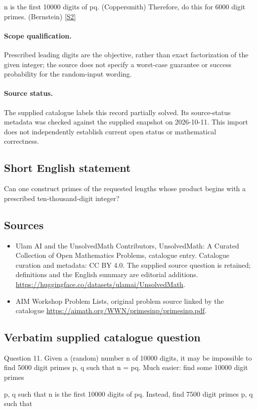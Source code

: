 \documentclass[11pt]{article}
\begin{document}
n is the first 10000 digits of pq. (Coppersmith) Therefore, do this for 6000 digit primes. (Bernstein) \href{https://aimath.org/WWN/primesinp/primesinp.pdf}{[S2]}
\paragraph{Scope qualification.}
Prescribed leading digits are the objective, rather than exact factorization of the given integer; the source does not specify a worst-case guarantee or success probability for the random-input wording.
\paragraph{Source status.}
The supplied catalogue labels this record partially solved. Its source-status metadata was checked against the supplied snapshot on 2026-10-11. This import does not independently establish current open status or mathematical correctness.
\subsection{Short English statement}
Can one construct primes of the requested lengths whose product begins with a prescribed ten-thousand-digit integer?
\subsection{Sources}
\begin{itemize}
\item[S1] Ulam AI and the UnsolvedMath Contributors, UnsolvedMath: A Curated Collection of Open Mathematics Problems, catalogue entry. Catalogue curation and metadata: CC BY 4.0. The supplied source question is retained; definitions and the English summary are editorial additions.
\url{https://huggingface.co/datasets/ulamai/UnsolvedMath}.
\item[S2] AIM Workshop Problem Lists, original problem source linked by the catalogue
\url{https://aimath.org/WWN/primesinp/primesinp.pdf}.
\end{itemize}
\subsection{Verbatim supplied catalogue question}
Question 11. Given a (random) number n of 10000 digits, it may be impossible to find 5000 digit primes p, q such that n = pq. Much easier: find some 10000 digit primes

p, q such that n is the first 10000 digits of pq. Instead, find 7500 digit primes p, q such that
\end{document}
